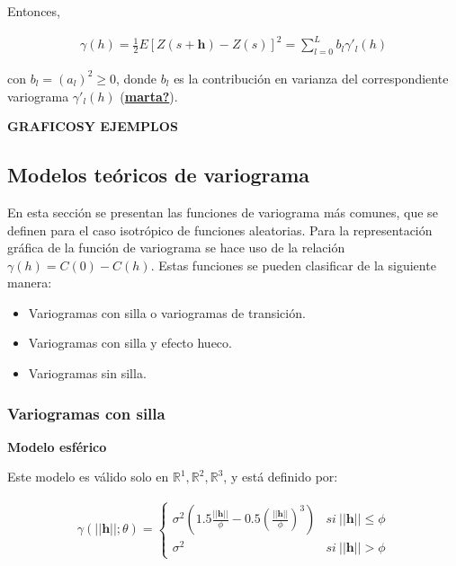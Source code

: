 \documentclass[
]{book}
\providecommand{\tightlist}{%
  \setlength{\itemsep}{0pt}\setlength{\parskip}{0pt}}
\begin{document}
Entonces,

\begin{align}
   \gamma(h)=\frac{1}{2} E[Z(s+\textbf{h})-Z(s)]^2=\sum_{l=0}^Lb_l\gamma'_l(h) 
\end{align}

con \(b_l=(a_l)^2\geq 0\), donde \(b_l\) es la contribución en varianza del correspondiente variograma \(\gamma'_l(h)\) (\protect\hyperlink{ref-marta}{\textbf{marta?}}).

\textbf{GRAFICOSY EJEMPLOS}

\hypertarget{modelos-teuxf3ricos-de-variograma}{%
\subsection{Modelos teóricos de variograma}\label{modelos-teuxf3ricos-de-variograma}}

En esta sección se presentan las funciones de variograma más comunes, que se definen para el caso isotrópico de funciones aleatorias. Para la representación gráfica de la función de variograma se hace uso de la relación \(\gamma(h)=C(0)-C(h)\). Estas funciones se pueden clasificar de la siguiente manera:

\begin{itemize}
\tightlist
\item
  Variogramas con silla o variogramas de transición.
\item
  Variogramas con silla y efecto hueco.
\item
  Variogramas sin silla.
\end{itemize}

\hypertarget{variogramas-con-silla}{%
\subsubsection*{Variogramas con silla}\label{variogramas-con-silla}}

\textbf{Modelo esférico}

Este modelo es válido solo en \(\mathbb{R}^1,\mathbb{R}^2,\mathbb{R}^3\), y está definido por:

\begin{align}
    \gamma(||\textbf{h}||;\theta) = \left \{ \begin{matrix} \sigma^2\left(1.5\frac{||\textbf{h}||}{\phi}-0.5\left(\frac{||\textbf{h}||}{\phi}\right)^3 \right) &  si \ ||\textbf{h}||\leq \phi
\\ \sigma^2 &  si\ ||\textbf{h}||>\phi \end{matrix}\right. 
\end{align}
\end{document}
